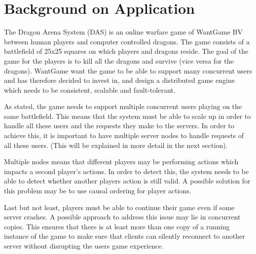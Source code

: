 \section{Background on Application }


The Dragon Arena System (DAS) is an online warfare game of WantGame BV between human players and computer controlled dragons.
The game consists of a battlefield of 25x25 squares on which players and dragons reside.
The goal of the game for the players is to kill all the dragons and survive (vice versa for the dragons).
WantGame want the game to be able to support many concurrent users and has therefore decided to invest in, and design a distributed game engine which needs to be consistent, scalable and fault-tolerant. 

As stated, the game needs to support multiple concurrent users playing on the same battlefield. 
This means that the system must be able to scale up in order to handle all these users and the requests they make to the servers. 
In order to achieve this, it is important to have multiple server nodes to handle requests of all these users. 
(This will be explained in more detail in the next section).

Multiple nodes means that different players may be performing actions which impacts a second player's actions.
In order to detect this, the system needs to be able to detect whether another players action is still valid. 
A possible solution for this problem may be to use causal ordering for player actions.

Last but not least, players must be able to continue their game even if some server crashes. 
A possible approach to address this issue may lie in concurrent copies. This ensures that there is at least more than one copy of a running instance of the game to make sure that clients can silently reconnect to another server without disrupting the users game experience. 
